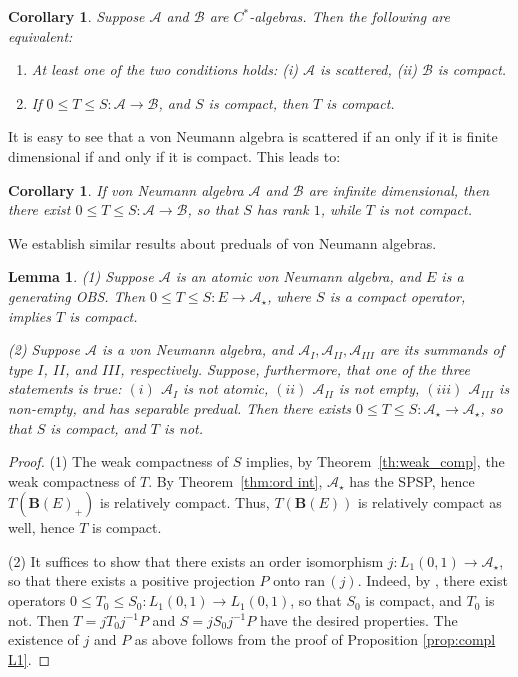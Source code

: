 \documentclass[12pt]{amsart}
\theoremstyle{plain}
\newtheorem{corollary}[theorem]{Corollary}
\newtheorem{lemma}[theorem]{Lemma}
\theoremstyle{definition}
\renewcommand{\leq}{\leqslant}
\newcommand{\ball}{\mathbf{B}}
\newcommand{\A}{\mathcal{A}}
\def \ran{{\mathrm{ran}} \, }
\begin{document}
\begin{corollary}\label{cor:scat}
Suppose $\A$ and ${\mathcal{B}}$ are $C^*$-algebras.
Then the following are equivalent:
\begin{enumerate}
\item
At least one of the two conditions holds:
(i) $\A$ is scattered, (ii) ${\mathcal{B}}$ is compact.
\item
If $0 \leq T \leq S : \A \to {\mathcal{B}}$, and $S$ is compact,
then $T$ is compact.
\end{enumerate}
\end{corollary}

It is easy to see that a von Neumann algebra is scattered
if an only if it is finite dimensional if and only if it
is compact. This leads to:

\begin{corollary}\label{cor:scat_vna}
If von Neumann algebra $\A$ and ${\mathcal{B}}$ are infinite dimensional,
then there exist $0 \leq T \leq S : \A \to {\mathcal{B}}$,
so that $S$ has rank $1$, while $T$ is not compact.
\end{corollary}

We establish similar results about preduals of von Neumann algebras.

\begin{lemma}\label{lem:C*alg_comp_int}
(1)
Suppose $\A$ is an atomic von Neumann algebra, and $E$ is a generating OBS.
Then $0 \leq T \leq S: E \to \A_\star$, where $S$ is a compact operator,
implies $T$ is compact.

(2)
Suppose $\A$ is a von Neumann algebra, and $\A_I, \A_{II}, \A_{III}$ are
its summands of type $I$, $II$, and $III$, respectively. Suppose,
furthermore, that one of the three statements is true:
$(i)$ $\A_I$ is not atomic, $(ii)$ $\A_{II}$ is not empty,
$(iii)$ $\A_{III}$ is non-empty, and has separable predual.
Then there exists $0 \leq T \leq S: \A_\star \to \A_\star$,
so that $S$ is compact, and $T$ is not.
\end{lemma}

\begin{proof}
(1) The weak compactness of $S$ implies, by Theorem~\ref{th:weak_comp},
the weak compactness of $T$. By Theorem~\ref{thm:ord int}, $\A_\star$
has the SPSP, hence $T(\ball(E)_+)$ is relatively compact. Thus,
$T(\ball(E))$ is relatively compact as well, hence $T$ is compact.

(2) It suffices to show that there exists an order isomorphism
$j: L_1(0,1) \to \A_\star$, so that there exists a positive
projection $P$ onto $\ran(j)$. Indeed, by \cite{Wi}, there exist
operators $0 \leq T_0 \leq S_0 : L_1(0,1) \to L_1(0,1)$, so that
$S_0$ is compact, and $T_0$ is not. Then $T = j T_0 j^{-1} P$
and $S = j S_0 j^{-1} P$ have the desired properties.
The existence of $j$ and $P$ as above follows from the proof of
Proposition \ref{prop:compl L1}.
\end{proof}
\end{document}
